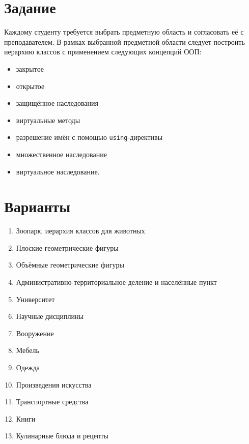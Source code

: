 \documentclass[a4paper,12pt]{article}
\begin{document}


\tableofcontents

\section{Задание}
\label{sec:Task}

Каждому студенту требуется выбрать предметную область и согласовать её
с преподавателем. В рамках выбранной предметной области следует
построить иерархию классов с применением следующих концепций ООП:

\begin{itemize}
\item закрытое
\item открытое
\item защищённое наследования
\item виртуальные методы
\item разрешение имён с помощью \lstinline|using|-директивы
\item множественное наследование
\item виртуальное наследование.
\end{itemize}

\section{Варианты}
\label{sec:Variants}

\begin{enumerate}
\item Зоопарк, иерархия классов для животных
\item Плоские геометрические фигуры
\item Объёмные геометрические фигуры
\item Административно-территориальное деление и населённые пункт
\item Университет
\item Научные дисциплины
\item Вооружение
\item Мебель
\item Одежда
\item Произведения искусства
\item Транспортные средства
\item Книги
\item Кулинарные блюда и рецепты
\end{enumerate}
\end{document}
